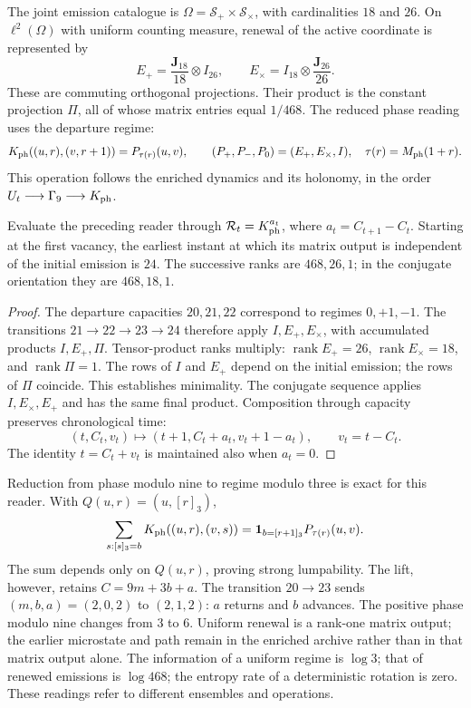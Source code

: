 The joint emission catalogue is
$\Omega=\mathcal S_+\times\mathcal S_\times$, with cardinalities
$18$ and $26$. On $\ell^2(\Omega)$ with uniform counting measure,
renewal of the active coordinate is represented by
\[
 E_+=\frac{\mathbf J_{18}}{18}\otimes I_{26},\qquad
 E_\times=I_{18}\otimes\frac{\mathbf J_{26}}{26}.
\]
These are commuting orthogonal projections. Their product is the
constant projection $\Pi$, all of whose matrix entries equal $1/468$.
The reduced phase reading uses the departure regime:
\[
 K_{\rm ph}((u,r),(v,r+1))=P_{\tau(r)}(u,v),
 \qquad(P_+,P_-,P_0)=(E_+,E_\times,I),
 \quad\tau(r)=M_{\rm ph}(1+r).
\]
This operation follows the enriched dynamics and its holonomy, in the
order $U_t\longrightarrow\Gamma_9\longrightarrow K_{\rm ph}$.

\begin{proposition}
\label{prop:ii-ter27-renovacion}
Evaluate the preceding reader through $\mathcal R_t=K_{\rm ph}^{a_t}$,
where $a_t=C_{t+1}-C_t$. Starting at the first vacancy, the earliest
instant at which its matrix output is independent of the initial emission
is $24$. The successive ranks are $468,26,1$; in the conjugate
orientation they are $468,18,1$.
\end{proposition}
\begin{proof}
The departure capacities $20,21,22$ correspond to regimes $0,+1,-1$.
The transitions $21\to22\to23\to24$ therefore apply
$I,E_+,E_\times$, with accumulated products $I,E_+,\Pi$.
Tensor-product ranks multiply: $\operatorname{rank}E_+=26$,
$\operatorname{rank}E_\times=18$, and $\operatorname{rank}\Pi=1$.
The rows of $I$ and $E_+$ depend on the initial emission; the rows of
$\Pi$ coincide. This establishes minimality. The conjugate sequence
applies $I,E_\times,E_+$ and has the same final product. Composition
through capacity preserves chronological time:
\[
 (t,C_t,v_t)\mapsto(t+1,C_t+a_t,v_t+1-a_t),\qquad v_t=t-C_t.
\]
The identity $t=C_t+v_t$ is maintained also when $a_t=0$.
\end{proof}

Reduction from phase modulo nine to regime modulo three is exact for
this reader. With $Q(u,r)=(u,[r]_3)$,
\[
 \sum_{s:[s]_3=b}K_{\rm ph}((u,r),(v,s))
 =\mathbf1_{b=[r+1]_3}P_{\tau(r)}(u,v).
\]
The sum depends only on $Q(u,r)$, proving strong lumpability. The lift,
however, retains $C=9m+3b+a$. The transition $20\to23$ sends
$(m,b,a)=(2,0,2)$ to $(2,1,2)$: $a$ returns and $b$ advances. The
positive phase modulo nine changes from $3$ to $6$. Uniform renewal
is a rank-one matrix output; the earlier microstate and path remain in
the enriched archive rather than in that matrix output alone.
The information of a uniform regime is $\log3$; that of renewed
emissions is $\log468$; the entropy rate of a deterministic rotation
is zero. These readings refer to different ensembles and operations.

